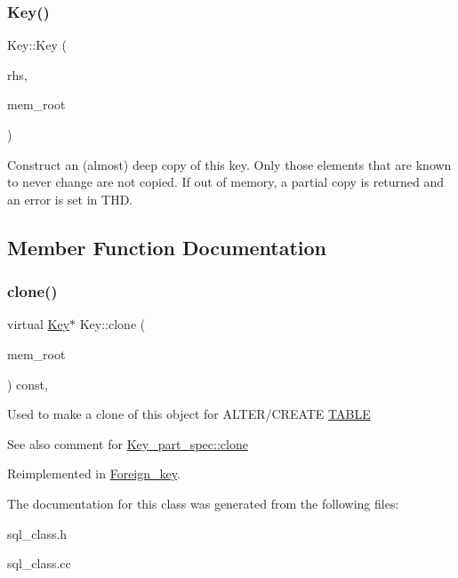 \subsubsection{\texorpdfstring{Key()}{Key()}}
{\footnotesize\ttfamily Key\+::\+Key (\begin{DoxyParamCaption}\item[{const \mbox{\hyperlink{classKey}{Key}} \&}]{rhs,  }\item[{M\+E\+M\+\_\+\+R\+O\+OT $\ast$}]{mem\+\_\+root }\end{DoxyParamCaption})}

Construct an (almost) deep copy of this key. Only those elements that are known to never change are not copied. If out of memory, a partial copy is returned and an error is set in T\+HD. 

\subsection{Member Function Documentation}
\mbox{\label{classKey_ac6f8cb767fc9dcee06fd80ca2350f43f}} 
\subsubsection{\texorpdfstring{clone()}{clone()}}
{\footnotesize\ttfamily virtual \mbox{\hyperlink{classKey}{Key}}$\ast$ Key\+::clone (\begin{DoxyParamCaption}\item[{M\+E\+M\+\_\+\+R\+O\+OT $\ast$}]{mem\+\_\+root }\end{DoxyParamCaption}) const\hspace{0.3cm}{\ttfamily [inline]}, {\ttfamily [virtual]}}

Used to make a clone of this object for A\+L\+T\+E\+R/\+C\+R\+E\+A\+TE \mbox{\hyperlink{structTABLE}{T\+A\+B\+LE}} \begin{DoxySeeAlso}{See also}
comment for \mbox{\hyperlink{classKey__part__spec_adf40542629144b3dc70f9ae4b4b27c78}{Key\+\_\+part\+\_\+spec\+::clone}} 
\end{DoxySeeAlso}


Reimplemented in \mbox{\hyperlink{classForeign__key_a6b95a958ac60355c961a0a173a439678}{Foreign\+\_\+key}}.



The documentation for this class was generated from the following files\+:\begin{DoxyCompactItemize}
\item 
sql\+\_\+class.\+h\item 
sql\+\_\+class.\+cc\end{DoxyCompactItemize}
